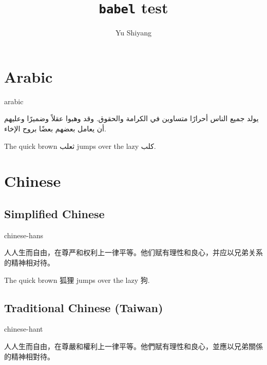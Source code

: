 \documentclass[11pt, a4paper]{article}
\begin{document}

	\title{\texttt{babel} test}
	\author{Yu Shiyang}


	\maketitle

	\section{Arabic}

		\begin{selectlanguage}{arabic}
			\begin{displayquote}
				يولد جميع الناس أحرارًا متساوين في الكرامة والحقوق. وقد وهبوا عقلاً وضميرًا وعليهم أن يعامل بعضهم بعضًا بروح الإخاء.
			\end{displayquote}
		\end{selectlanguage}

		The quick brown \foreignlanguage{arabic}{ثعلب} jumps over the lazy \foreignlanguage{arabic}{كلب}.

	\section{Chinese}

		\subsection{Simplified Chinese}

			\begin{selectlanguage}{chinese-hans}
				\begin{displayquote}
					人人生而自由，在尊严和权利上一律平等。他们赋有理性和良心，并应以兄弟关系的精神相对待。
				\end{displayquote}
			\end{selectlanguage}

			The quick brown \foreignlanguage{chinese-hans}{狐狸} jumps over the lazy \foreignlanguage{chinese-hans}{狗}.

		\subsection{Traditional Chinese (Taiwan)}

			\begin{selectlanguage}{chinese-hant}
				\begin{displayquote}
					人人生而自由，在尊嚴和權利上一律平等。他們賦有理性和良心，並應以兄弟關係的精神相對待。
				\end{displayquote}
			\end{selectlanguage}
\end{document}
